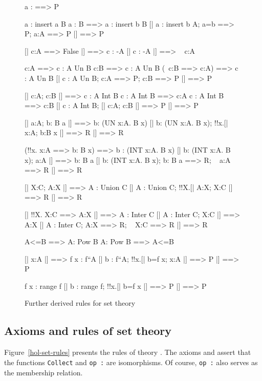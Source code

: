 \begin{figure} \underscoreon
\begin{ttbox}
   a : {\ttlbrace}{\ttrbrace} ==> P

 a : insert a B
 a : B ==> a : insert b B
  [| a : insert b A;  a=b ==> P;  a:A ==> P |] ==> P

   [| c:A ==> False |] ==> c : -A
   [| c : -A |] ==> ~ c:A

     c:A ==> c : A Un B
     c:B ==> c : A Un B
     (~c:B ==> c:A) ==> c : A Un B
      [| c : A Un B;  c:A ==> P;  c:B ==> P |] ==> P

     [| c:A;  c:B |] ==> c : A Int B
    c : A Int B ==> c:A
    c : A Int B ==> c:B
     [| c : A Int B;  [| c:A; c:B |] ==> P |] ==> P

     [| a:A;  b: B a |] ==> b: (UN x:A. B x)
     [| b: (UN x:A. B x);  !!x.[| x:A;  b:B x |] ==> R |] ==> R

    (!!x. x:A ==> b: B x) ==> b : (INT x:A. B x)
    [| b: (INT x:A. B x);  a:A |] ==> b: B a
    [| b: (INT x:A. B x);  b: B a ==> R;  ~ a:A ==> R |] ==> R

   [| X:C;  A:X |] ==> A : Union C
   [| A : Union C;  !!X.[| A:X;  X:C |] ==> R |] ==> R

   [| !!X. X:C ==> A:X |] ==> A : Inter C
   [| A : Inter C;  X:C |] ==> A:X
   [| A : Inter C;  A:X ==> R;  ~ X:C ==> R |] ==> R

     A<=B ==> A: Pow B
     A: Pow B ==> A<=B

   [| x:A |] ==> f x : f``A
   [| b : f``A;  !!x.[| b=f x;  x:A |] ==> P |] ==> P

   f x : range f
   [| b : range f;  !!x.[| b=f x |] ==> P |] ==> P
\end{ttbox}
\caption{Further derived rules for set theory} \label{hol-set2}
\end{figure}


\subsection{Axioms and rules of set theory}
Figure~\ref{hol-set-rules} presents the rules of theory .  The
axioms  and  assert
that the functions \texttt{Collect} and \hbox{\tt op :} are isomorphisms.  Of
course, \hbox{\tt op :} also serves as the membership relation.

